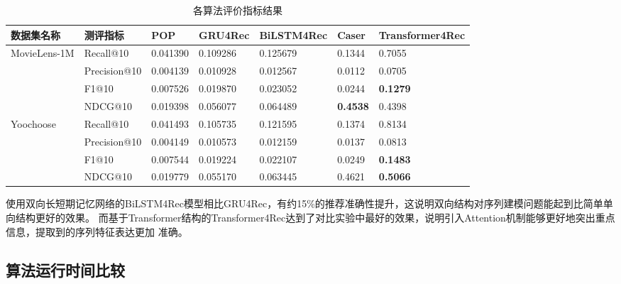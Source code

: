 \begin{table}[]
\centering
\caption{各算法评价指标结果}
\label{table:result}
  \begin{tabular}{@{}lllllll@{}}
  \toprule
  数据集名称                     & 测评指标      & POP      & GRU4Rec  & \textbf{BiLSTM4Rec} & Caser & \textbf{Transformer4Rec} \\ \midrule
  \multirow{4}{*}{MovieLens-1M} & Recall@10    & 0.041390 & 0.109286 & 0.125679 & 0.1344 & 0.7055      \\
                                & Precision@10 & 0.004139 & 0.010928 & 0.012567 & 0.0112 & 0.0705      \\
                                & F1@10        & 0.007526 & 0.019870 & 0.023052 & 0.0244 & \textbf{0.1279}      \\
                                & NDCG@10      & 0.019398 & 0.056077 & 0.064489 & \textbf{0.4538} & 0.4398      \\
  \multirow{4}{*}{Yoochoose}    & Recall@10    & 0.041493 & 0.105735 & 0.121595 & 0.1374 & 0.8134      \\
                                & Precision@10 & 0.004149 & 0.010573 & 0.012159 & 0.0137 & 0.0813      \\
                                & F1@10        & 0.007544 & 0.019224 & 0.022107 & 0.0249 & \textbf{0.1483}      \\
                                & NDCG@10      & 0.019779 & 0.055170 & 0.063445 & 0.4621 & \textbf{0.5066}      \\ \cmidrule(l){2-7} 
  \end{tabular}
\end{table}
使用双向长短期记忆网络的BiLSTM4Rec模型相比GRU4Rec，有约15\%的推荐准确性提升，这说明双向结构对序列建模问题能起到比简单单向结构更好的效果。
而基于Transformer结构的Transformer4Rec达到了对比实验中最好的效果，说明引入Attention机制能够更好地突出重点信息，提取到的序列特征表达更加
准确。

\subsection{算法运行时间比较}

